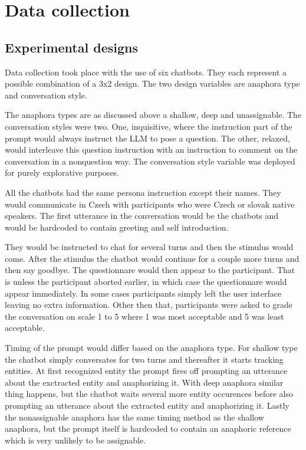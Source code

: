 
\section{Data collection}

\subsection{Experimental designs}

Data collection took place with the use of six chatbots.
They each represent a possible combination of a 3x2 design.
The two design variables are anaphora type and conversation style.

The anaphora types are as discussed above a shallow, deep and unassignable.
The conversation styles were two. One, inquisitive,
where the instruction part of the prompt
would always instruct the LLM to pose a question.
The other, relaxed, would interleave this question instruction with
an instruction to comment on the conversation in a nonquestion way.
The conversation style variable was deployed for purely explorative purposes.

All the chatbots had the same persona instruction except their names.
They would communicate in Czech with participants who were Czech or slovak native speakers.
The first utterance in the conversation would be the chatbots and
would be hardcoded to contain greeting and self introduction.

They would be instructed to chat for several turns and then the stimulus would come.
After the stimulus the chatbot would continue for a couple more turns and then say goodbye.
The questionnare would then appear to the participant.
That is unless the participant aborted earlier, in which case the questionnare would appear immediately.
In some cases participants simply left the user interface leaving no extra information.
Other then that, participants were asked to grade the conversation on scale 1 to 5
where 1 was most acceptable and 5 was least acceptable.

Timing of the prompt would differ based on the anaphora type.
For shallow type the chatbot simply conversates for two turns and thereafter it starts tracking entities.
At first recognized entity the prompt fires off
prompting an utterance about the exctracted entity and anaphorizing it.
With deep anaphora similar thing happens,
but the chatbot waits several more entity occurences
before also prompting an utterance about the extracted entity and anaphorizing it.
Lastly the nonassignable anaphora has the same timing method as the shallow anaphora,
but the prompt itself is hardcoded to contain an anaphoric reference which is
very unlikely to be assignable.

